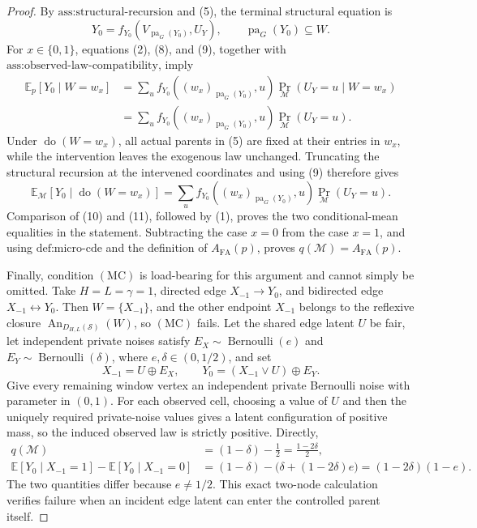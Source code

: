 \documentclass{article}
\begin{document}
\begin{proof}
By \(\text{ass:structural-recursion}\) and (5), the terminal structural equation is
\[
Y_0=f_{Y_0}\!\left(V_{\operatorname{pa}_G(Y_0)},U_Y\right),
\qquad \operatorname{pa}_G(Y_0)\subseteq W.
\tag{9}
\]
For \(x\in\{0,1\}\), equations (2), (8), and (9), together with \(\text{ass:observed-law-compatibility}\), imply
\[
\begin{aligned}
\mathbb E_p[Y_0\mid W=w_x]
&=\sum_u f_{Y_0}\!\left((w_x)_{\operatorname{pa}_G(Y_0)},u\right)
  \Pr_{\mathcal M}(U_Y=u\mid W=w_x)\\
&=\sum_u f_{Y_0}\!\left((w_x)_{\operatorname{pa}_G(Y_0)},u\right)
  \Pr_{\mathcal M}(U_Y=u).
\end{aligned}
\tag{10}
\]
Under \(\operatorname{do}(W=w_x)\), all actual parents in (5) are fixed at their entries in \(w_x\), while the intervention leaves the exogenous law unchanged.  Truncating the structural recursion at the intervened coordinates and using (9) therefore gives
\[
\mathbb E_{\mathcal M}[Y_0\mid\operatorname{do}(W=w_x)]
=\sum_u f_{Y_0}\!\left((w_x)_{\operatorname{pa}_G(Y_0)},u\right)
  \Pr_{\mathcal M}(U_Y=u).
\tag{11}
\]
Comparison of (10) and (11), followed by (1), proves the two conditional-mean equalities in the statement.  Subtracting the case \(x=0\) from the case \(x=1\), and using \(\text{def:micro-cde}\) and the definition of \(A_{\mathrm{FA}}(p)\), proves \(q(\mathcal M)=A_{\mathrm{FA}}(p)\).

Finally, condition \(\mathrm{(MC)}\) is load-bearing for this argument and cannot simply be omitted.  Take \(H=L=\gamma=1\), directed edge \(X_{-1}\to Y_0\), and bidirected edge \(X_{-1}\leftrightarrow Y_0\).  Then \(W=\{X_{-1}\}\), and the other endpoint \(X_{-1}\) belongs to the reflexive closure \(\operatorname{An}_{D_{H,L}(\mathcal S)}(W)\), so \(\mathrm{(MC)}\) fails.  Let the shared edge latent \(U\) be fair, let independent private noises satisfy \(E_X\sim\operatorname{Bernoulli}(e)\) and \(E_Y\sim\operatorname{Bernoulli}(\delta)\), where \(e,\delta\in(0,1/2)\), and set
\[
X_{-1}=U\mathbin\oplus E_X,
\qquad
Y_0=(X_{-1}\mathbin\lor U)\mathbin\oplus E_Y.
\tag{12}
\]
Give every remaining window vertex an independent private Bernoulli noise with parameter in \((0,1)\).  For each observed cell, choosing a value of \(U\) and then the uniquely required private-noise values gives a latent configuration of positive mass, so the induced observed law is strictly positive.  Directly,
\[
\begin{aligned}
q(\mathcal M)
&=(1-\delta)-\frac12=\frac{1-2\delta}{2},\\
\mathbb E[Y_0\mid X_{-1}=1]-\mathbb E[Y_0\mid X_{-1}=0]
&=(1-\delta)-\bigl(\delta+(1-2\delta)e\bigr)
=(1-2\delta)(1-e).
\end{aligned}
\tag{13}
\]
The two quantities differ because \(e\ne1/2\).  This exact two-node calculation verifies failure when an incident edge latent can enter the controlled parent itself.
\end{proof}
\end{document}
